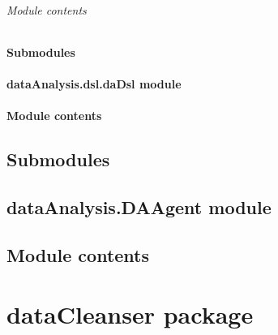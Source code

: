 \documentclass[letterpaper,10pt,english]{sphinxmanual}
\begin{document}
\begin{fulllineitems}
\label{dataAnalysis.dsl.req:dataAnalysis.dsl.req.csvHandle.writeDictCSV}
\end{fulllineitems}



\subparagraph{Module contents}
\label{dataAnalysis.dsl.req:module-dataAnalysis.dsl.req}\label{dataAnalysis.dsl.req:module-contents}

\subsubsection{Submodules}
\label{dataAnalysis.dsl:submodules}

\subsubsection{dataAnalysis.dsl.daDsl module}
\label{dataAnalysis.dsl:dataanalysis-dsl-dadsl-module}

\subsubsection{Module contents}
\label{dataAnalysis.dsl:module-dataAnalysis.dsl}\label{dataAnalysis.dsl:module-contents}

\section{Submodules}
\label{dataAnalysis:submodules}

\section{dataAnalysis.DAAgent module}
\label{dataAnalysis:dataanalysis-daagent-module}

\section{Module contents}
\label{dataAnalysis:module-dataAnalysis}\label{dataAnalysis:module-contents}

\chapter{dataCleanser package}
\label{dataCleanser:datacleanser-package}\label{dataCleanser::doc}
\end{document}
